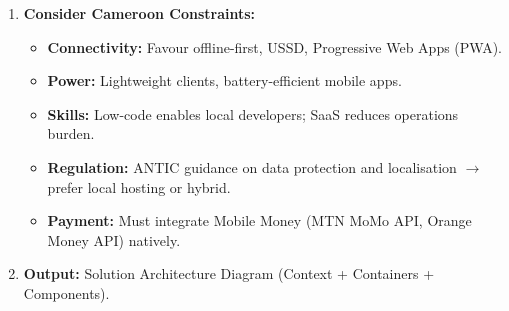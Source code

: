 \documentclass[11pt]{article}
\begin{document}
\begin{methode}
\begin{enumerate}
\begin{center}
\begin{tabularx}{\linewidth}{|X|c|c|c|c|}
    \end{tabularx}
    \end{center}
    \emph{Example calculation (Buy SaaS):} $5(0.30)+3(0.25)+2(0.20)+1(0.15)+3(0.10)=1.5+0.75+0.4+0.15+0.3=3.10$. Recompute each column the same way; the highest score wins, subject to constraints below.
    \item \textbf{Consider Cameroon Constraints:}
    \begin{itemize}
        \item \textbf{Connectivity:} Favour offline-first, USSD, Progressive Web Apps (PWA).
        \item \textbf{Power:} Lightweight clients, battery-efficient mobile apps.
        \item \textbf{Skills:} Low-code enables local developers; SaaS reduces operations burden.
        \item \textbf{Regulation:} ANTIC guidance on data protection and localisation $\to$ prefer local hosting or hybrid.
        \item \textbf{Payment:} Must integrate Mobile Money (MTN MoMo API, Orange Money API) natively.
    \end{itemize}
    \item \textbf{Output:} Solution Architecture Diagram (Context + Containers + Components).
\end{enumerate}
\end{methode}
\end{document}
